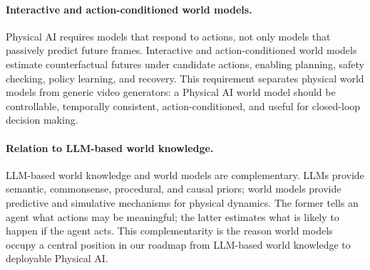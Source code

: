\paragraph{Interactive and action-conditioned world models.}
Physical AI requires models that respond to actions, not only models that passively predict future frames. 
Interactive and action-conditioned world models estimate counterfactual futures under candidate actions, enabling planning, safety checking, policy learning, and recovery. 
This requirement separates physical world models from generic video generators: a Physical AI world model should be controllable, temporally consistent, action-conditioned, and useful for closed-loop decision making.

\paragraph{Relation to LLM-based world knowledge.}
LLM-based world knowledge and world models are complementary. 
LLMs provide semantic, commonsense, procedural, and causal priors; world models provide predictive and simulative mechanisms for physical dynamics. 
The former tells an agent what actions may be meaningful; the latter estimates what is likely to happen if the agent acts. 
This complementarity is the reason world models occupy a central position in our roadmap from LLM-based world knowledge to deployable Physical AI.